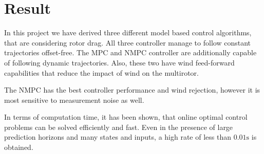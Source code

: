 \chapter{Result}
\label{sec:result}
In this project we have derived three different model based control algorithms, that are considering rotor drag. All three controller manage to follow constant trajectories offset-free. The MPC and NMPC controller are additionally capable of following dynamic trajectories. Also, these two have wind feed-forward capabilities that reduce the impact of wind on the multirotor.

The NMPC has the best controller performance and wind rejection, however it is most sensitive to measurement noise as well.

In terms of computation time, it has been shown, that online optimal control problems can be solved efficiently and fast. Even in the presence of large prediction horizons and many states and inputs, a high rate of less than $0.01 \si{\second}$ is obtained. 

